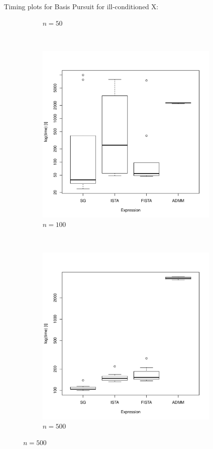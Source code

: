 \documentclass[xcolor=dvipsnames,aspectratio=1610]{beamer}
\theoremstyle{remark}
\begin{document}
\begin{frame}{Timing plots for Basis Pursuit for ill-conditioned X:}
\begin{figure}[H]
\begin{subfigure}[b]{0.2\textwidth}
        \caption{$n=50$}
        \label{fig:50}
    \end{subfigure}
\\
    \begin{subfigure}[b]{0.2\textwidth}
        \includegraphics[width=\textwidth]{100timing-cn.pdf}
        \caption{$n=100$}
        \label{fig:100}
    \end{subfigure}
~
    \begin{subfigure}[b]{0.2\textwidth}
        \includegraphics[width=\textwidth]{500timing-cn.pdf}
        \caption{$n=500$}
        \label{fig:500}
    \end{subfigure}
\label{fig:cvgc}
\end{figure}
\end{frame}
\end{document}
